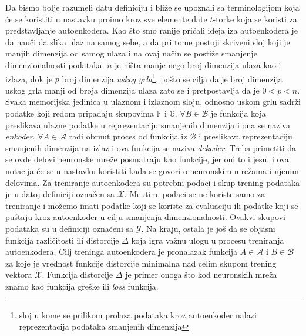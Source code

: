\documentclass{article}
\begin{document}
	Da bismo bolje razumeli datu definiciju i bli\v ze se upoznali sa terminologijom koja \'ce se koristiti u nastavku pro\dj imo kroz sve elemente date $t$-torke koja se koristi za predstavljanje autoenkodera. 
	Kao \v sto smo ranije pri\v cali ideja iza autoenkodera je da nau\v ci da slika ulaz na samog sebe, a da pri tome postoji skriveni sloj koji je manjih dimenzija od samog ulaza i na ovaj na\v cin se posti\v ze smanjenje dimenzionalnosti podataka.
	$n$ je ni\v sta manje nego broj dimenzija ulaza kao i izlaza, dok je $p$ broj dimenzija \emph{uskog grla}\footnote{sloj u kome se prilikom prolaza podataka kroz autoenkoder nalazi reprezentacija podataka smanjenih dimenzija}, po\v sto se cilja da je broj dimenzija uskog grla manji od broja dimenzija ulaza zato se i pretpostavlja da je $0 < p < n$. 
	Svaka memorijska jedinica u ulaznom i izlaznom sloju, odnosno uskom grlu sadr\v zi podatke koji redom pripadaju skupovima $\mathbb{F}$ i $\mathbb{G}$. $\forall B \in \mathcal{B}$ je funkcija koja preslikava ulazne podatke u reprezentaciju smanjenih dimenzija i ona se naziva \emph{enkoder}. $\forall A \in \mathcal{A}$ radi obrnut proces od funkcija iz $\mathcal{B}$ i preslikava reprezentaciju smanjenih dimenzija na izlaz i ova funkcija se naziva \emph{dekoder}.
	Treba primetiti da se ovde delovi neuronske mre\v ze posmatraju kao funkcije, jer oni to i jesu, i ova notacija \'ce se u nastavku koristiti kada se govori o neuronskim mre\v zama i njenim delovima.
	Za treniranje autoenkodera su potrebni podaci i skup trening podataka je u datoj definiciji ozna\v cen sa $\mathcal{X}$.
	Me\dj utim, podaci se ne koriste samo za treniranje i mo\v zemo imati podatke koji se koriste za evaluaciju ili podatke koji se pu\v staju kroz autoenkoder u cilju smanjenja dimenzionalnosti. 
	Ovakvi skupovi podataka su u definiciji ozna\v ceni sa $\mathcal{Y}$. 
	Na kraju, ostala je jo\v s da se objasni funkcija razli\v citosti ili distorcije $\Delta$ koja igra va\v znu ulogu u procesu treniranja autoenkodera.
	Cilj treninga autoenkodera je pronalazak funkcija $A \in \mathcal{A}$ i $B \in \mathcal{B}$ za koje je vrednost funkcije distorcije minimalna nad celim skupom trening vektora $\mathcal{X}$. 
	Funkcija distorcije $\Delta$ je primer onoga \v sto kod neuronskih mre\v za znamo kao funkcija gre\v ske ili \emph{loss} funkcija.
	
\end{document}

